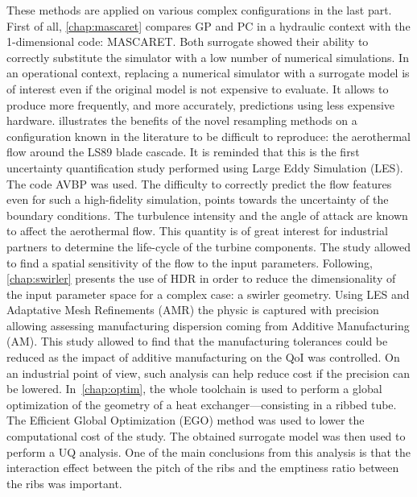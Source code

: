 These methods are applied on various complex configurations in the last part. First of all, \cref{chap:mascaret} compares GP and PC in a hydraulic context with the 1-dimensional code: MASCARET. Both surrogate showed their ability to correctly substitute the simulator with a low number of numerical simulations. In an operational context, replacing a numerical simulator with  a surrogate model is of interest even if the original model is not expensive to evaluate. It allows to produce more frequently, and more accurately, predictions using less expensive hardware.  illustrates the benefits of the novel resampling methods on a configuration known in the literature to be difficult to reproduce: the aerothermal flow around the LS89 blade cascade. It is reminded that this is the first uncertainty quantification study performed using Large Eddy Simulation (LES). The code AVBP was used. The difficulty to correctly predict the flow features even for such a high-fidelity simulation, points towards the uncertainty of the boundary conditions. The turbulence intensity and the angle of attack are known to affect the aerothermal flow. This quantity is of great interest for industrial partners to determine the life-cycle of the turbine components. The study allowed to find a spatial sensitivity of the flow to the input parameters. Following, \cref{chap:swirler} presents the use of HDR in order to reduce the dimensionality of the input parameter space for a complex case: a swirler geometry. Using LES and Adaptative Mesh Refinements (AMR) the physic is captured with precision allowing assessing manufacturing dispersion coming from Additive Manufacturing (AM). This study allowed to find that the manufacturing tolerances could be reduced as the impact of additive manufacturing on the QoI was controlled. On an industrial point of view, such analysis can help reduce cost if the precision can be lowered. In~\cref{chap:optim}, the whole toolchain is used to perform a global optimization of the geometry of a heat exchanger---consisting in a ribbed tube. The Efficient Global Optimization (EGO) method was used to lower the computational cost of the study. The obtained surrogate model was then used to perform a UQ analysis. One of the main conclusions from this analysis is that the interaction effect between the pitch of the ribs and the emptiness ratio between the ribs was important. %

